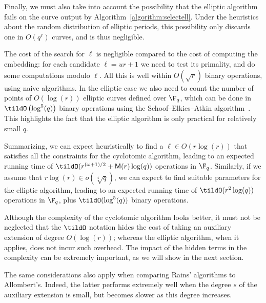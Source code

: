 Finally, we must also take into account the possibility that the
elliptic algorithm fails on the curve output by
Algorithm~\ref{algorithm:selectell}. %
Under the heuristics about the random distribution of elliptic
periods, this possibility only discards one in $O(q^r)$ curves, and is
thus negligible.

The cost of the search for $\ell$ is negligible compared to the cost
of computing the embedding: for each candidate $\ell=ur+1$ we need to
test its primality, and do some computations modulo $\ell$. %
All this is well within $O(\sqrt{r})$ binary operations, using naive
algorithms. %
In the elliptic case we also need to count the number of points of
$O(\log(r))$ elliptic curves defined over $\F_q$, which can be done in
$\tildO\left(\log^5(q)\right)$ binary operations using the
Schoof--Elkies--Atkin algorithm~\cite{schoof95,lercier+sirvent08}. %
This highlights the fact that the elliptic algorithm is only practical
for relatively small $q$.

Summarizing, we can expect heuristically to find a
$\ell\in O(r\log(r))$ that satisfies all the constraints for the
cyclotomic algorithm, leading to an expected running time of
$\tildO(r^{(\omega+1)/2}+\MM(r)\log(q))$ operations in $\F_q$.  %
Similarly, if we assume that $r\log(r)\in o(\sqrt[4]{q})$, we can
expect to find suitable parameters for the elliptic algorithm, leading
to an expected running time of $\tildO(r^2\log(q))$ operations in
$\F_q$, plus $\tildO(\log^5(q))$ binary operations.

Although the complexity of the cyclotomic algorithm looks better, it
must not be neglected that the $\tildO$ notation
hides the cost of taking an auxiliary extension of degree
$O(\log(r))$; whereas the elliptic algorithm, when it applies, does
not incur such overhead. The impact of the hidden terms in the
complexity can be extremely important, as we will show in the next
section. 

The same considerations also apply when comparing Rains' algorithms to
Allombert's. Indeed, the latter performs extremely well when the
degree $s$ of the auxiliary extension is small, but becomes slower as
this degree increases.


